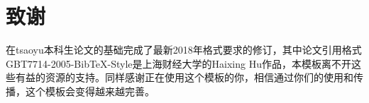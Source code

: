 \section*{致谢}

在tsaoyu本科生论文的基础完成了最新2018年格式要求的修订，其中论文引用格式GBT7714-2005-BibTeX-Style是上海财经大学的Haixing Hu作品，本模板离不开这些有益的资源的支持。同样感谢正在使用这个模板的你，相信通过你们的使用和传播，这个模板会变得越来越完善。